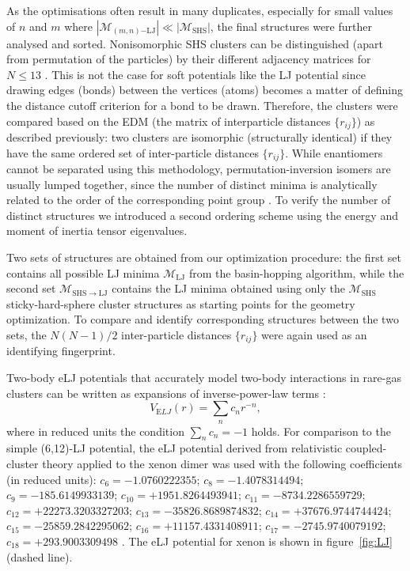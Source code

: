As the optimisations often result in many duplicates, especially for small
values of $n$ and $m$ where $|\mathcal{M}_{(m,n)\mathrm{-LJ}}| \ll
|\mathcal{M}_\mathrm{SHS}|$, the final structures were further analysed and
sorted. Nonisomorphic \ac{SHS} clusters can be distinguished (apart from
permutation of the particles) by their different adjacency matrices for $N \leq
13$ \autocite{Holmes-Cerfon_EnumeratingRigidSphere_2016}.  This is not the case
for soft potentials like the LJ potential since drawing edges (bonds) between
the vertices (atoms) becomes a matter of defining the distance cutoff criterion
for a bond to be drawn. Therefore, the clusters were compared based on the
\ac{EDM} (the matrix of interparticle distances $\{r_{ij}\}$) as described
previously: two clusters are isomorphic (structurally identical) if they have
the same ordered set of inter-particle distances $\{r_{ij}\}$.  While
enantiomers cannot be separated using this methodology, permutation-inversion
isomers are usually lumped together, since the number of distinct minima is
analytically related to the order of the corresponding point group
\autocite{Wales_Energylandscapes_2003}.  To verify the number of distinct structures we introduced
a second ordering scheme using the energy and moment of inertia tensor
eigenvalues. 

Two sets of structures are obtained from our optimization procedure: the first
set contains all possible LJ minima $\mathcal{M}_\mathrm{LJ}$ from the
basin-hopping algorithm, while the second set $\mathcal{M}_\mathrm{SHS\to LJ}$
contains the LJ minima obtained using only the $\mathcal{M}_\mathrm{SHS}$
sticky-hard-sphere cluster structures as starting points for the geometry
optimization.  To compare and identify corresponding structures between the two
sets, the $N(N-1)/2$ inter-particle distances $\{r_{ij}\}$ were again used as
an identifying fingerprint.

Two-body \ac{eLJ} potentials that accurately model
two-body interactions in rare-gas clusters can be written as expansions of
inverse-power-law terms
\autocite{Schwerdtfeger_ExtensionLennardJonespotential_2006}:
%
\begin{equation} \label{eq:ELJ}
V_{\mathrm ELJ}(r)=\sum_{n} c_nr^{-n},
\end{equation}
%
where in reduced units the condition $\sum_{n} c_n=-1$ holds. For comparison
to the simple (6,12)-\ac{LJ} potential, the \ac{eLJ} potential derived from
relativistic coupled-cluster theory applied to the xenon dimer was used with the
following coefficients (in reduced units):
$c_6=-1.0760222355$; $c_8=-1.4078314494$; $c_9=-185.6149933139$;
$c_{10}=+1951.8264493941$; $c_{11}=-8734.2286559729$;
$c_{12}=+22273.3203327203$; $c_{13}=-35826.8689874832$;
$c_{14}=+37676.9744744424$; $c_{15}=-25859.2842295062$;
$c_{16}=+11157.4331408911$; $c_{17}=-2745.9740079192$; $c_{18}=+293.9003309498$
\autocite{Jerabek_relativisticcoupledclusterinteraction_2017}. The \ac{eLJ}
potential for xenon is shown in figure~\ref{fig:LJ} (dashed line).


